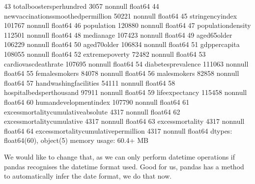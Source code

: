 \documentclass[letterpaper,10pt,english]{jupyterBook}
\begin{document}
\begin{sphinxVerbatim}[commandchars=\\\{\}]
 43  total\PYGZus{}boosters\PYGZus{}per\PYGZus{}hundred               3057 non\PYGZhy{}null    float64
 44  new\PYGZus{}vaccinations\PYGZus{}smoothed\PYGZus{}per\PYGZus{}million    50221 non\PYGZhy{}null   float64
 45  stringency\PYGZus{}index                         101767 non\PYGZhy{}null  float64
 46  population                               120880 non\PYGZhy{}null  float64
 47  population\PYGZus{}density                       112501 non\PYGZhy{}null  float64
 48  median\PYGZus{}age                               107423 non\PYGZhy{}null  float64
 49  aged\PYGZus{}65\PYGZus{}older                            106229 non\PYGZhy{}null  float64
 50  aged\PYGZus{}70\PYGZus{}older                            106834 non\PYGZhy{}null  float64
 51  gdp\PYGZus{}per\PYGZus{}capita                           108055 non\PYGZhy{}null  float64
 52  extreme\PYGZus{}poverty                          72482 non\PYGZhy{}null   float64
 53  cardiovasc\PYGZus{}death\PYGZus{}rate                    107695 non\PYGZhy{}null  float64
 54  diabetes\PYGZus{}prevalence                      111063 non\PYGZhy{}null  float64
 55  female\PYGZus{}smokers                           84078 non\PYGZhy{}null   float64
 56  male\PYGZus{}smokers                             82858 non\PYGZhy{}null   float64
 57  handwashing\PYGZus{}facilities                   54111 non\PYGZhy{}null   float64
 58  hospital\PYGZus{}beds\PYGZus{}per\PYGZus{}thousand               97911 non\PYGZhy{}null   float64
 59  life\PYGZus{}expectancy                          115458 non\PYGZhy{}null  float64
 60  human\PYGZus{}development\PYGZus{}index                  107790 non\PYGZhy{}null  float64
 61  excess\PYGZus{}mortality\PYGZus{}cumulative\PYGZus{}absolute     4317 non\PYGZhy{}null    float64
 62  excess\PYGZus{}mortality\PYGZus{}cumulative              4317 non\PYGZhy{}null    float64
 63  excess\PYGZus{}mortality                         4317 non\PYGZhy{}null    float64
 64  excess\PYGZus{}mortality\PYGZus{}cumulative\PYGZus{}per\PYGZus{}million  4317 non\PYGZhy{}null    float64
dtypes: float64(60), object(5)
memory usage: 60.4+ MB
\end{sphinxVerbatim}

\sphinxAtStartPar
We would like to change that, as we can only perform datetime operations if pandas recognises the datetime format used.
Good for us, pandas has a method to automatically infer the date format, we do that now.

\begin{sphinxVerbatim}[commandchars=\\\{\}]
  
\end{sphinxVerbatim}
\end{document}
